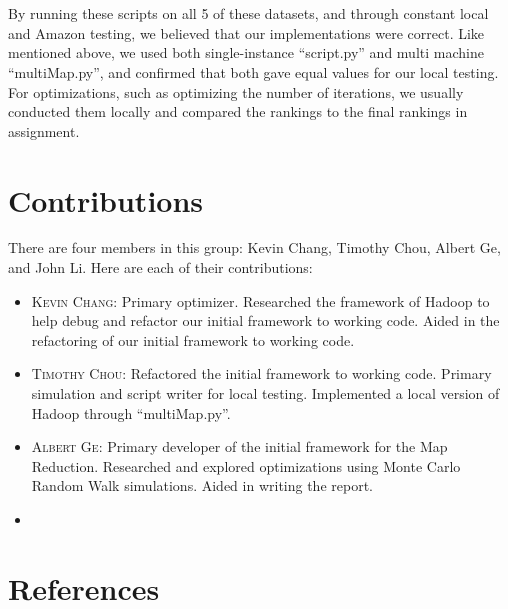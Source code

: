  \\ \\
 By running these scripts on all 5 of these datasets, and through constant local and Amazon testing, we believed that our implementations were correct. Like mentioned above, we used both single-instance ``script.py'' and multi machine ``multiMap.py'', and confirmed that both gave equal values for our local testing. For optimizations, such as optimizing the number of iterations, we usually conducted them locally and compared the rankings to the final rankings in assignment. 

\section{Contributions}
There are four members in this group: Kevin Chang, Timothy Chou, Albert Ge, and John Li. Here are each of their contributions:
\begin{itemize}
  \item \textsc{Kevin Chang}: Primary optimizer. Researched the framework of Hadoop to help debug and refactor our initial framework to working code. Aided in the refactoring of our initial framework to working code.
  \item \textsc{Timothy Chou}: Refactored the initial framework to working code. Primary simulation and script writer for local testing. Implemented a local version of Hadoop through ``multiMap.py''.
  \item \textsc{Albert Ge}: Primary developer of the initial framework for the Map Reduction. Researched and explored optimizations using Monte Carlo Random Walk simulations. Aided in writing the report.
  \item
 \end{itemize}
\section{References}



